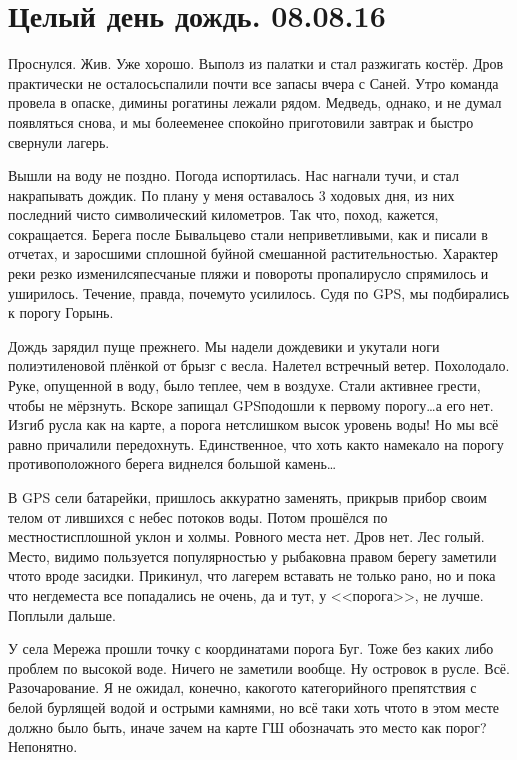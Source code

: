 \chapter{Целый день дождь. 08.08.16} 

Проснулся. Жив. Уже хорошо. Выполз из палатки и стал разжигать костёр. Дров практически не осталось\mdash спалили почти все запасы вчера с Саней. Утро команда провела в опаске, димины рогатины лежали рядом. Медведь, однако, и не думал появляться снова, и мы более\sdash менее спокойно приготовили завтрак и быстро свернули лагерь. 

Вышли на воду не поздно. Погода испортилась. Нас нагнали тучи, и стал накрапывать дождик. По плану у меня оставалось 3 ходовых дня, из них последний чисто символический километров. Так что, поход, кажется, сокращается. Берега после Бывальцево стали неприветливыми, как и писали в отчетах, и заросшими сплошной буйной смешанной растительностью. Характер реки резко изменился\mdash песчаные пляжи и повороты пропали\mdash русло спрямилось и уширилось. Течение, правда, почему\sdash то усилилось. Судя по GPS, мы подбирались к порогу Горынь.

Дождь зарядил пуще прежнего. Мы надели дождевики и укутали ноги полиэтиленовой плёнкой от брызг с весла. Налетел встречный ветер. Похолодало. Руке, опущенной в воду, было теплее, чем в воздухе. Стали активнее грести, чтобы не мёрзнуть. Вскоре запищал GPS\mdash подошли к первому порогу\ldots а его нет. Изгиб русла как на карте, а порога нет\mdash слишком высок уровень воды! Но мы всё равно причалили передохнуть. Единственное, что хоть как\sdash то намекало на порог\mdash у противоположного берега виднелся большой камень\ldots 

В GPS сели батарейки, пришлось аккуратно заменять, прикрыв прибор своим телом от лившихся с небес потоков воды. Потом прошёлся по местности\mdash сплошной уклон и холмы. Ровного места нет. Дров нет. Лес голый. Место, видимо пользуется популярностью у рыбаков\mdash на правом берегу заметили что\sdash то вроде засидки. Прикинул, что лагерем вставать не только рано, но и пока что негде\mdash места все попадались не очень, да и тут, у <<порога>>, не лучше. Поплыли дальше. 

У села Мережа прошли точку с координатами порога Буг. Тоже без каких либо проблем по высокой воде. Ничего не заметили вообще. Ну островок в русле. Всё. Разочарование. Я не ожидал, конечно, какого\sdash то категорийного препятствия с белой бурлящей водой и острыми камнями, но всё таки хоть что\sdash то в этом месте должно было быть, иначе зачем на карте ГШ обозначать это место как порог? Непонятно. 

